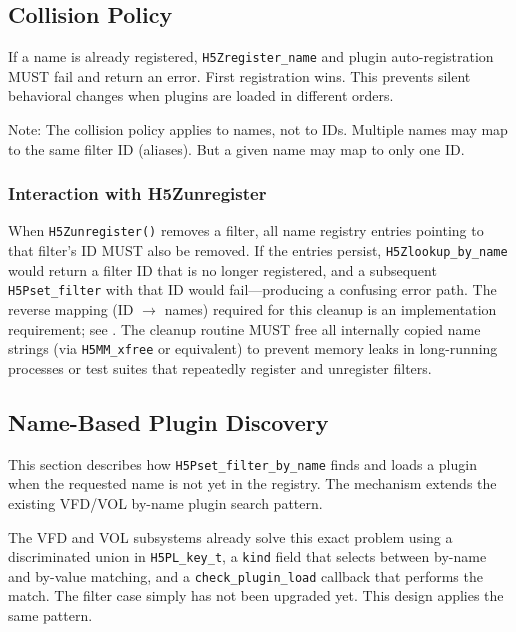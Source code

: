 \documentclass[../HDF5_RFC.tex]{subfiles}
\begin{document}
\subsection{Collision Policy}
\label{sec:collision-policy}

If a name is already registered, \texttt{H5Zregister\_name} and plugin
auto-registration MUST fail and return an error. First registration wins. This
prevents silent behavioral changes when plugins are loaded in different orders.

Note: The collision policy applies to names, not to IDs. Multiple names may
map to the same filter ID (aliases). But a given name may map to only one ID.

\subsubsection{Interaction with H5Zunregister}

When \texttt{H5Zunregister()} removes a filter, all name registry entries pointing to
that filter's ID MUST also be removed. If the entries persist,
\texttt{H5Zlookup\_by\_name} would return a filter ID that is no longer registered, and
a subsequent \texttt{H5Pset\_filter} with that ID would fail---producing a confusing
error path. The reverse mapping (ID $\rightarrow$ names) required for this cleanup is an
implementation requirement; see . The cleanup routine MUST free all
internally copied name strings (via \texttt{H5MM\_xfree} or equivalent) to prevent
memory leaks in long-running processes or test suites that repeatedly register
and unregister filters.


\subsection{Name-Based Plugin Discovery}
\label{sec:name-discovery}

This section describes how \texttt{H5Pset\_filter\_by\_name} finds and loads a plugin
when the requested name is not yet in the registry. The mechanism extends the
existing VFD/VOL by-name plugin search pattern.

The VFD and VOL subsystems already solve this exact problem using a
discriminated union in \texttt{H5PL\_key\_t}, a \texttt{kind} field that selects between
by-name and by-value matching, and a \texttt{check\_plugin\_load} callback that
performs the match. The filter case simply has not been upgraded yet. This
design applies the same pattern.
\end{document}
